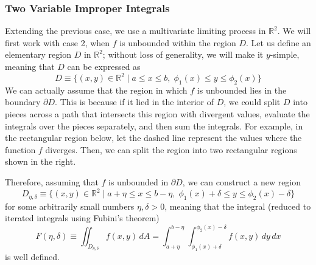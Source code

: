 \documentclass{article}
\theoremstyle{remark}
\theoremstyle{definition}
\begin{document}
\subsubsection{Two Variable Improper Integrals}
Extending the previous case, we use a multivariate limiting process in $\mathbb{R}^2$. We will first work with case 2, when $f$ is unbounded within the region $D$. Let us define an elementary region $D$ in $\mathbb{R}^2$; without loss of generality, we will make it $y$-simple, meaning that $D$ can be expressed as
  \[D \equiv \{ (x, y) \in \mathbb{R}^2 \; | \; a \leq x \leq b, \; \phi_1 (x) \leq y \leq \phi_2 (x)\}\]
We can actually assume that the region in which $f$ is unbounded lies in the boundary $\partial D$. This is because if it lied in the interior of $D$, we could split $D$ into pieces across a path that intersects this region with divergent values, evaluate the integrals over the pieces separately, and then sum the integrals. For example, in the rectangular region below, let the dashed line represent the values where the function $f$ diverges. Then, we can split the region into two rectangular regions shown in the right. 
\begin{center}
\end{center}
Therefore, assuming that $f$ is unbounded in $\partial D$, we can construct a new region 
\[D_{\eta, \delta} \equiv \{(x, y) \in \mathbb{R}^2 \; | \; a + \eta \leq x \leq b - \eta, \; \phi_1 (x) + \delta \leq y \leq \phi_2 (x) - \delta\}\]
for some arbitrarily small numbers $\eta, \delta >0$, meaning that the integral (reduced to iterated integrals using Fubini's theorem) 
\[F(\eta, \delta) \equiv \iint_{D_{\eta, \delta}} f(x, y) \, dA = \int_{a + \eta}^{b - \eta} \int_{\phi_1 (x) + \delta}^{\phi_2 (x) - \delta} f(x, y) \, dy\,dx\]
is well defined. 
\begin{center}
\end{center}
\end{document}
